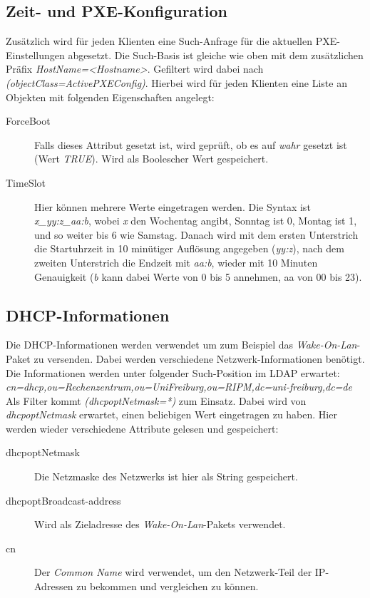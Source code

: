 \documentclass[	
				a4paper, 
				twoside,
				11pt,
				DIV11,
				BCOR12mm,
				bibtotoc, 
				halfparskip, 
				headsepline, 
				pointlessnumbers]{scrartcl}
\begin{document}
\subsection{Zeit- und PXE-Konfiguration}
Zusätzlich wird für jeden Klienten eine Such-Anfrage für die aktuellen PXE-Einstellungen abgesetzt.
Die Such-Basis ist gleiche wie oben mit dem zusätzlichen Präfix \textit{HostName=<Hostname>}.
Gefiltert wird dabei nach \textit{(objectClass=ActivePXEConfig)}. Hierbei wird für jeden Klienten eine Liste an Objekten mit folgenden Eigenschaften angelegt:
\begin{description}
\item[ForceBoot] Falls dieses Attribut gesetzt ist, wird geprüft, ob es auf \textit{wahr} gesetzt ist (Wert \textit{TRUE}). Wird als Boolescher Wert gespeichert.
\item[TimeSlot] Hier können mehrere Werte eingetragen werden. Die Syntax ist \textit{x\_yy:z\_aa:b}, wobei \textit{x} den Wochentag angibt, Sonntag ist 0, Montag ist 1, und so weiter bis 6 wie Samstag. Danach wird mit dem ersten Unterstrich die Startuhrzeit in 10 minütiger Auflösung angegeben (\textit{yy:z}), nach dem zweiten Unterstrich die Endzeit mit \textit{aa:b}, wieder mit 10 Minuten Genauigkeit (\textit{b} kann dabei Werte von 0 bis 5 annehmen, aa von 00 bis 23).
\end{description}

\subsection{DHCP-Informationen}
Die DHCP-Informationen werden verwendet um zum Beispiel das \textit{Wake-On-Lan}-Paket zu versenden. Dabei werden verschiedene Netzwerk-Informationen benötigt. Die Informationen werden unter folgender Such-Position im LDAP erwartet: \\
\textit{cn=dhcp,ou=Rechenzentrum,ou=UniFreiburg,ou=RIPM,dc=uni-freiburg,dc=de} \\
Als Filter kommt \textit{(dhcpoptNetmask=*)} zum Einsatz. Dabei wird von \textit{dhcpoptNetmask} erwartet, einen beliebigen Wert eingetragen zu haben.
Hier werden wieder verschiedene Attribute gelesen und gespeichert:
\begin{description}
\item[dhcpoptNetmask] Die Netzmaske des Netzwerks ist hier als String gespeichert.
\item[dhcpoptBroadcast-address] Wird als Zieladresse des \textit{Wake-On-Lan}-Pakets verwendet.
\item[cn] Der \textit{Common Name} wird verwendet, um den Netzwerk-Teil der IP-Adressen zu bekommen und vergleichen zu können.
\end{description}
\end{document}
